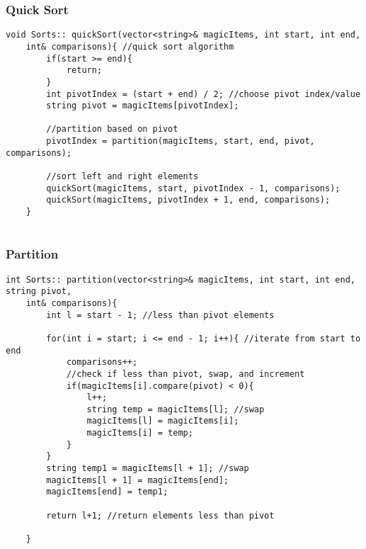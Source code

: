\documentclass[letterpaper, 10pt,DIV=13]{scrartcl}
\numberwithin{equation}{section} %
\numberwithin{figure}{section} %
\numberwithin{table}{section} %
\begin{document}
\subsubsection*{Quick Sort}
    \lstset{numbers=left, numberstyle=\tiny, stepnumber=1, numbersep=5pt, basicstyle=\footnotesize\ttfamily}
    \begin{lstlisting}[frame=single, ]
    void Sorts:: quickSort(vector<string>& magicItems, int start, int end,
    int& comparisons){ //quick sort algorithm
        if(start >= end){
            return;
        }
        int pivotIndex = (start + end) / 2; //choose pivot index/value
        string pivot = magicItems[pivotIndex];

        //partition based on pivot
        pivotIndex = partition(magicItems, start, end, pivot, comparisons);

        //sort left and right elements
        quickSort(magicItems, start, pivotIndex - 1, comparisons); 
        quickSort(magicItems, pivotIndex + 1, end, comparisons);
    }
    
\end{lstlisting}

\subsubsection*{Partition}
    \lstset{numbers=left, numberstyle=\tiny, stepnumber=1, numbersep=5pt, basicstyle=\footnotesize\ttfamily}
    \begin{lstlisting}[frame=single, ]
    int Sorts:: partition(vector<string>& magicItems, int start, int end, string pivot,
    int& comparisons){
        int l = start - 1; //less than pivot elements
    
        for(int i = start; i <= end - 1; i++){ //iterate from start to end
            comparisons++;
            //check if less than pivot, swap, and increment
            if(magicItems[i].compare(pivot) < 0){ 
                l++;
                string temp = magicItems[l]; //swap
                magicItems[l] = magicItems[i];
                magicItems[i] = temp;
            }
        }
        string temp1 = magicItems[l + 1]; //swap
        magicItems[l + 1] = magicItems[end];
        magicItems[end] = temp1;
    
        return l+1; //return elements less than pivot
    
    }
    
\end{lstlisting}

\pagebreak
\end{document}
